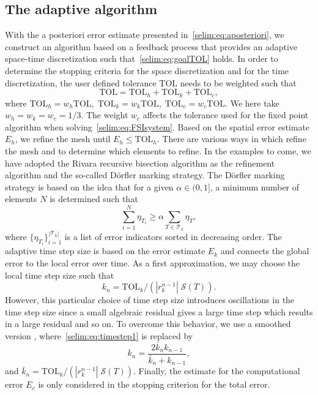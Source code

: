 \subsection{The adaptive algorithm}

With the a posteriori error estimate presented
in~\eqref{selim:eq:aposteriori}, we construct an algorithm based on a
feedback process that provides an adaptive space-time discretization
such that~\eqref{selim:eq:goalTOL} holds.
In order to determine the stopping criteria for the space
discretization and for the time discretization, the user defined
tolerance $\mathrm{TOL}$ needs to be weighted such that
\begin{equation}
\mathrm{TOL} = \mathrm{TOL}_h + \mathrm{TOL}_k + \mathrm{TOL}_c,
\end{equation}
where $\mathrm{TOL}_h = w_h \mathrm{TOL}, \;\mathrm{TOL}_k = w_k
\mathrm{TOL}, \;\mathrm{TOL}_c = w_c \mathrm{TOL}$.  We here take $w_h
= w_k = w_c = 1/3$. The weight $w_c$ affects the tolerance used for
the fixed point algorithm when
solving~\eqref{selim:eq:FSIsystem}. Based on the spatial error
estimate $E_h$, we refine the mesh until $E_h \leqslant \mathrm{TOL}_h$.
There are various ways in which refine the mesh and to determine which
elements to refine. In the examples to come, we have adopted the
Rivara recursive bisection algorithm as the refinement algorithm
and the so-called
D\"{o}rfler \citep{Dorfler1996} marking strategy. The D\"{o}rfler
marking strategy is based on the idea that for a given
$\alpha\in(0,1]$, a minimum number of elements $N$ is determined
such that
\begin{equation}
  \label{selim:eq:dorfler}
\sum_{i=1}^{N}\eta_{T_i} \geqslant  \alpha \sum_{T\in\mathcal{T}_h}\eta_T ,
\end{equation}
where $\{ \eta_{T_{i}}\}_{i = 1}^{|\mathcal{T}_h|}$ is a list of error
indicators sorted in decreasing order. The adaptive time step size is
based on the error estimate $E_k$ and connects the global error to the
local error over time. As a first approximation, we may choose the
local time step size such that
\begin{equation}
\label{selim:eq:timestep1}
k_n = \mathrm{TOL}_k /(| r_k^{n-1} |\; \mathcal{S}(T)).
\end{equation}
However, this particular choice of time step size introduces
oscillations in the time step size since a small algebraic residual
gives a large time step which results in a large residual and so
on. To overcome this behavior, we use a smoothed
version \citep{Logg2004}, where~\eqref{selim:eq:timestep1} is replaced
by
\begin{equation}
\label{selim:eq:timestep2}
k_n = \frac{2\bar{k}_n k_{n-1}}{\bar{k}_n + k_{n-1}},
\end{equation}
and $\bar{k}_n = \mathrm{TOL}_k/(| r_k^{n-1} |
\;\mathcal{S}(T))$. Finally, the estimate for the computational error
$E_c$ is only considered in the stopping criterion for the total
error.

